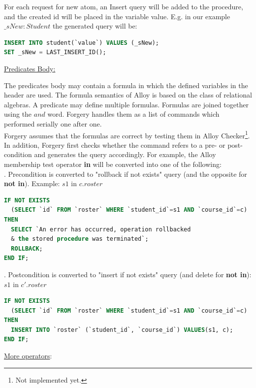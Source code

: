 \documentclass[oneside]{book}
\begin{document}
For each request for new atom, an Insert query will be added to the procedure, and the created id will be placed in the variable value. E.g. in our example $\_sNew : Student$ the generated query will be:
\begin{lstlisting}[escapechar=@,language=SQL]
INSERT INTO student(`value`) VALUES (_sNew);
SET _sNew = LAST_INSERT_ID();
\end{lstlisting}

\noindent\underline{Predicates Body:}

\noindent The predicates body may contain a formula in which the defined variables in the header are used.
The formula semantics of Alloy is based on the class of relational algebras. A predicate may define multiple formulas. Formulas are joined together using the $and$ word. Forgery handles them as a list of commands which performed serially one after one.\\

\noindent Forgery assumes that the formulas are correct by testing them in Alloy Checker\footnote{Not implemented yet.}. In addition, Forgery first checks whether the command refers to a pre- or post-condition and generates the query accordingly. For example, the Alloy membership test operator \textbf{in} will be converted into one of the following:\\

. Precondition is converted to "rollback if not exists" query (and the opposite for \textbf{not in}). Example: $s1$ in $c.roster$

\begin{lstlisting}[escapechar=@,language=SQL]
IF NOT EXISTS 
  (SELECT `id` FROM `roster` WHERE `student_id`=s1 AND `course_id`=c) 
THEN
  SELECT `An error has occurred, operation rollbacked 
  & the stored procedure was terminated`;
  ROLLBACK;
END IF;
\end{lstlisting}

. Postcondition is converted to "insert if not exists" query (and delete for \textbf{not in}): $s1$ in $c'.roster$

\begin{lstlisting}[escapechar=@,language=SQL]
IF NOT EXISTS 
  (SELECT `id` FROM `roster` WHERE `student_id`=s1 AND `course_id`=c) 
THEN
  INSERT INTO `roster` (`student_id`, `course_id`) VALUES(s1, c);
END IF;
\end{lstlisting}

\noindent\underline{More operators}:
\end{document}
